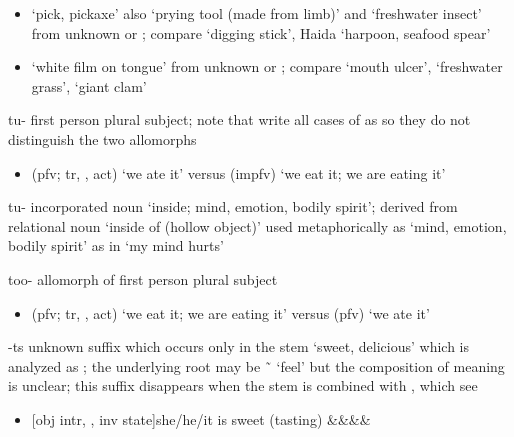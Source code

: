 \begin{morphdesc}[resume*=alphalist]
\begin{enumerate}
\begin{itemize}
		\item	{} ‘pick, pickaxe’ 
			also  ‘prying tool (made from limb)’
			and  ‘freshwater insect’
			from unknown  or ;
			compare  ‘digging stick’,
			Haida  ‘harpoon, seafood spear’ \parencite[1062]{enrico:2005}
		\item	{} ‘white film on tongue’
			from unknown  or ;
			compare  ‘mouth ulcer’,
			 ‘freshwater grass’,
			 ‘giant clam’
		\end{itemize}
	\end{enumerate}

\item[tu-]
	first person plural subject;
	note that \cite{story-naish:1973} write all cases of  as 
		so they do not distinguish the two allomorphs
	\begin{itemize}
	\item	{} (pfv; tr, ,  act) ‘we ate it’\newline
		versus  (impfv) ‘we eat it; we are eating it’
	\end{itemize}

\item[tu-]
	incorporated noun ‘inside; mind, emotion, bodily spirit’;
	derived from relational noun  ‘inside of (hollow object)’
	used metaphorically as ‘mind, emotion, bodily spirit’ as in  ‘my mind hurts’

\item[too-]
	allomorph of first person plural subject 
	\begin{itemize}
	\item	{} (pfv; tr, ,  act) ‘we eat it; we are eating it’\newline
		versus  (pfv) ‘we ate it’
	\end{itemize}

\item[-ts]\label{m:-ts}
	unknown suffix which occurs only in the stem  ‘sweet, delicious’
		which is analyzed as ;
	the underlying root may be  \~\  ‘feel’
		but the composition of meaning is unclear;
	this suffix disappears when the stem  is combined with ,
		which see
	\begin{itemize}
	\item	{}[obj intr, , inv state]{she/he/it is sweet (tasting)}
				{&&&\·&\·}
	\end{itemize}
\end{morphdesc}

